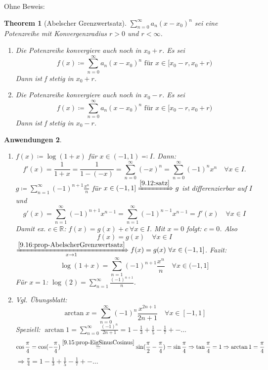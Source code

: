 \documentclass[12pt]{extreport} %
\newcommand{\R}{\mathbb{R}}
\theoremstyle{named}
\newtheorem{unnamedtheorem}{Theorem} \counterwithin{unnamedtheorem}{chapter}
\theoremstyle{dotless}
\newtheorem{anwendungen}[unnamedtheorem]{Anwendungen}
\begin{document}
Ohne Beweis: 
\begin{unnamedtheorem}[Abelscher Grenzwertsatz] \label{9.16:prop-AbelscherGrenzwertsatz}
$\sum_{n=0}^{\infty} a_{n} (x - x_{0})^{n}$ sei eine Potenzreihe mit Konvergenzradius $r > 0$ und $r < \infty$.
	\begin{enumerate}
		\item Die Potenzreihe konvergiere auch noch in $x_{0} + r$. Es sei
			$$ f(x) \coloneqq \sum_{n=0}^{\infty} a_{n} (x - x_{0})^{n} \text{ für } x \in [x_{0} - r, x_{0} + r) $$
			Dann ist f stetig in $x_{0} + r$.
		\item Die Potenzreihe konvergiere auch noch in $x_{0} - r$. Es sei
			$$ f(x) \coloneqq \sum_{n=0}^{\infty} a_{n} (x - x_{0})^{n} \text{ für } x \in [x_{0} - r, x_{0} + r) $$
			Dann ist f stetig in $x_{0} - r$.
	\end{enumerate}


\end{unnamedtheorem}


\begin{anwendungen} ~\ \label{9.17:anwendungen}
	\begin{enumerate}
		\item $f(x) \coloneqq \log(1+x)$ für $x \in (-1, 1) \eqqcolon I$. Dann: \label{9.17.a:anwendungen}
			$$ f'(x) = \frac{1}{1+x} = \frac{1}{1 - (-x)} = \sum_{n=0}^{\infty} (-x)^{n} = \sum_{n=0}^{\infty} (-1)^{n} x^{n} \quad \forall x \in I. $$
			$g \coloneqq \sum_{n=1}^{\infty} (-1)^{n+1} \frac{x^{n}}{n}$ für $x \in (-1, 1] \xRightarrow[]{\ref{9.12:satz}} g$ ist differenzierbar auf $I$ und 
			$$ g'(x) = \sum_{n=1}^{\infty} (-1)^{n+1} x^{n-1} = \sum_{n=1}^{\infty} (-1)^{n-1} x^{n-1} = f'(x) \quad \forall x \in I $$
			Damit ex. $c \in \R$: $f(x) = g(x) + c ~\forall x \in I$. Mit $x = 0$ folgt: $c = 0$. Also
			$$ f(x) = g(x) \quad \forall x \in I $$
			$\xRightarrow[x \rightarrow 1]{\ref{9.16:prop-AbelscherGrenzwertsatz}} f(x) = g(x) ~\forall x \in (-1, 1]$. Fazit:
			$$ \log(1+x) = \sum_{n=1}^{\infty} (-1)^{n+1} \frac{x^{n}}{n} \quad \forall x \in (-1 , 1] $$
			Für $x = 1$: $\log(2) = \sum_{n=1}^{\infty} \frac{(-1)^{n+1}}{n}$. 
		\item Vgl. Übungsblatt: \label{9.17.b:anwendungen}
			$$ \arctan x = \sum_{n=0}^{\infty} (-1)^{n} \frac{x^{2n +1}}{2n + 1} \quad \forall x \in [-1, 1] $$
			Speziell: $\arctan 1 = \sum_{n=0}^{\infty} \frac{(-1)^{n}}{2n + 1} = 1 - \frac{1}{3} + \frac{1}{5} - \frac{1}{7} +- \dotsc$
		$$ \cos \frac{\pi}{4} = \cos(-\frac{\pi}{4}) \overset{\ref{9.15:prop-EigSinusCosinus}}{=} \sin( \frac{\pi}{2} - \frac{\pi}{4}) = \sin \frac{\pi}{4} \Rightarrow \tan \frac{\pi}{4} = 1 \Rightarrow \arctan 1 = \frac{\pi}{4} $$
		$\Rightarrow \frac{\pi}{4} = 1 - \frac{1}{3} + \frac{1}{5} - \frac{1}{7} +- \dotsc$
	\end{enumerate}
\end{anwendungen}
\end{document}
